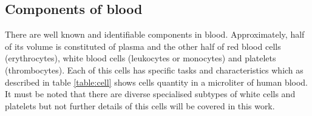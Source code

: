 
\subsection{Components of blood}
\label{section literature 1.1}
There are well known and identifiable components in blood. Approximately, half of its volume is constituted of plasma and the other half of red blood cells (erythrocytes), white blood cells (leukocytes or monocytes) and platelets (thrombocytes). Each of this cells has specific tasks and characteristics which as described in table \ref{table:cell} shows cells quantity in a microliter of human blood. It must be noted that there are diverse specialised subtypes of white cells and platelets but not further details of this cells will be covered in this work.

